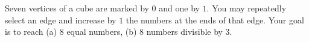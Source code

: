 Seven vertices of a cube are marked by $0$ and one by $1$. You may repeatedly select an edge and increase by $1$ the numbers at the ends of that edge. Your goal is to reach (a) $8$ equal numbers, (b) $8$ numbers divisible by $3$.
